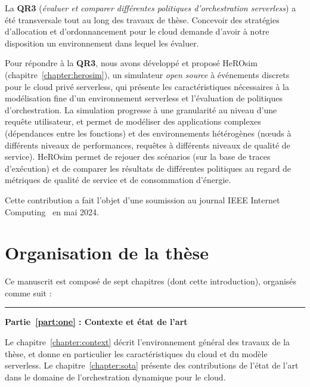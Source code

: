 
La \textbf{QR3} (\textit{évaluer et comparer différentes politiques d'orchestration serverless}) a été transversale tout au long des travaux de thèse. Concevoir des stratégies d'allocation et d'ordonnancement pour le cloud demande d'avoir à notre disposition un environnement dans lequel les évaluer.

Pour répondre à la \textbf{QR3}, nous avons développé et proposé HeROsim (chapitre~\ref{chapter:herosim}), un simulateur \textit{open source} à événements discrets pour le cloud privé serverless, qui présente les caractéristiques nécessaires à la modélisation fine d'un environnement serverless et l'évaluation de politiques d'orchestration. La simulation progresse à une granularité au niveau d'une requête utilisateur, et permet de modéliser des applications complexes (dépendances entre les fonctions) et des environnements hétérogènes (nœuds à différents niveaux de performances, requêtes à différents niveaux de qualité de service). HeROsim permet de rejouer des scénarios (sur la base de traces d'exécution) et de comparer les résultats de différentes politiques au regard de métriques de qualité de service et de consommation d'énergie.

Cette contribution a fait l'objet d'une soumission au journal IEEE Internet Computing~\cite{herosim} en mai 2024.

\clearpage

\section{Organisation de la thèse}

Ce manuscrit est composé de sept chapitres (dont cette introduction), organisés comme suit :

\begin{center}
    \rule{4cm}{0.4pt}
\end{center}

\textbf{Partie~\ref{part:one} : Contexte et état de l'art}

Le chapitre~\ref{chapter:context} décrit l'environnement général des travaux de la thèse, et donne en particulier les caractéristiques du cloud et du modèle serverless. Le chapitre~\ref{chapter:sota} présente des contributions de l'état de l'art dans le domaine de l'orchestration dynamique pour le cloud.

